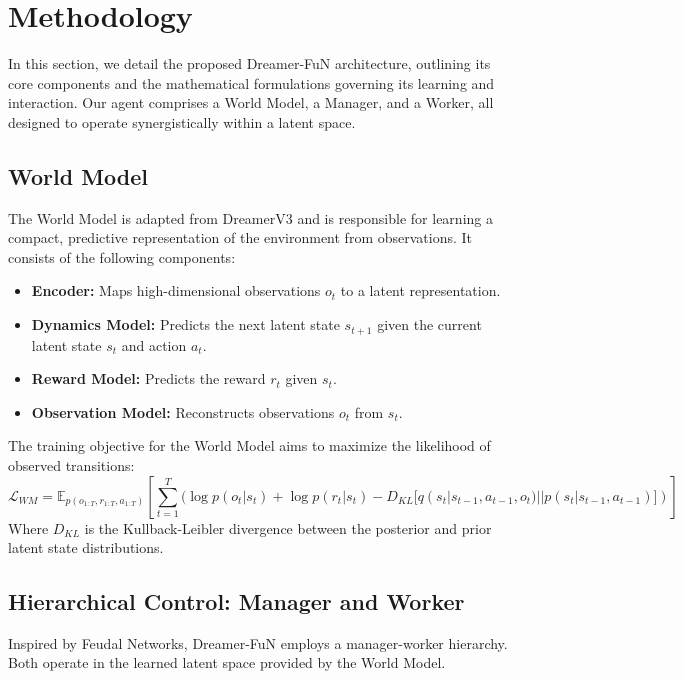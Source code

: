 \documentclass[conference]{IEEEtran}
\begin{document}
\section{Methodology}
In this section, we detail the proposed Dreamer-FuN architecture, outlining its core components and the mathematical formulations governing its learning and interaction. Our agent comprises a World Model, a Manager, and a Worker, all designed to operate synergistically within a latent space.

\subsection{World Model}
The World Model is adapted from DreamerV3 and is responsible for learning a compact, predictive representation of the environment from observations. It consists of the following components:
\begin{itemize}
    \item \textbf{Encoder:} Maps high-dimensional observations \(o_t\) to a latent representation.
    \item \textbf{Dynamics Model:} Predicts the next latent state \(s_{t+1}\) given the current latent state \(s_t\) and action \(a_t\).
    \item \textbf{Reward Model:} Predicts the reward \(r_t\) given \(s_t\).
    \item \textbf{Observation Model:} Reconstructs observations \(o_t\) from \(s_t\).
\end{itemize}
The training objective for the World Model aims to maximize the likelihood of observed transitions:
\[ \mathcal{L}_{WM} = \mathbb{E}_{p(o_{1:T}, r_{1:T}, a_{1:T})} \left[ \sum_{t=1}^T ( \log p(o_t | s_t) + \log p(r_t | s_t) - D_{KL}[q(s_t|s_{t-1}, a_{t-1}, o_t) || p(s_t|s_{t-1}, a_{t-1})] ) \right] \]
Where \(D_{KL}\) is the Kullback-Leibler divergence between the posterior and prior latent state distributions.

\subsection{Hierarchical Control: Manager and Worker}
Inspired by Feudal Networks, Dreamer-FuN employs a manager-worker hierarchy. Both operate in the learned latent space provided by the World Model.
\end{document}
